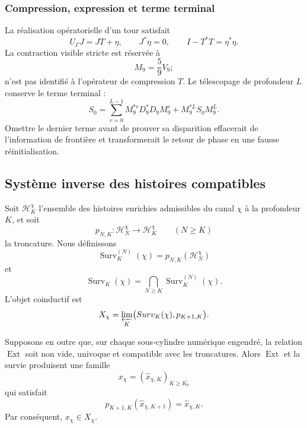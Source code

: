 \subsubsection{Compression, expression et terme terminal}

La réalisation opératorielle d’un tour satisfait
\begin{equation}
 U_\Gamma J=JT+\eta,
 \qquad
 J^*\eta=0,
 \qquad
 I-T^*T=\eta^*\eta.
 \label{p12-83-c9-s4:eq:compresion-expresion-precision}
\end{equation}
La contraction visible stricte est réservée à
\[
 M_9=\frac59V_9;
\]
n’est pas identifié à l’opérateur de compression \(T\). Le télescopage de
profondeur \(L\) conserve le terme terminal :
\begin{equation}
 S_0=
 \sum_{r=0}^{L-1}M_9^{*r}D_9^*D_9M_9^r
 +M_9^{*L}S_0M_9^L.
 \label{p12-83-c9-s4:eq:telescopia-terminal-precision}
\end{equation}
Omettre le dernier terme avant de prouver sa disparition effacerait
de l’information de frontière et transformerait le retour de phase en une fausse
réinitialisation.

\subsection{Système inverse des histoires compatibles}

Soit \(\mathcal H_K^\chi\) l’ensemble des histoires enrichies admissibles
du canal \(\chi\) à la profondeur \(K\), et soit
\[
 p_{N,K}:\mathcal H_N^\chi\longrightarrow\mathcal H_K^\chi
 \qquad(N\geq K)
\]
la troncature. Nous définissons
\[
 \operatorname{Surv}_K^{(N)}(\chi)
 =p_{N,K}(\mathcal H_N^\chi)
\]
et
\begin{equation}
 \operatorname{Surv}_K(\chi)
 =\bigcap_{N\geq K}\operatorname{Surv}_K^{(N)}(\chi).
 \label{p12-83-c9-s4:eq:supervivencia-todas-profundidades}
\end{equation}
L’objet coinductif est
\begin{equation}
 X_\chi=
 \varprojlim_K
 \bigl(\operatorname{Surv}_K(\chi),p_{K+1,K}\bigr).
 \label{p12-83-c9-s4:eq:limite-inverso-caracteres}
\end{equation}

\begin{theorem}
\label{p12-83-c9-s4:thm:seccion-compatible-caracteres}
Supposons en outre que, sur chaque sous-cylindre numérique engendré, la
relation \(\operatorname{Ext}\) soit non vide, univoque et compatible avec les
troncatures. Alors \(\operatorname{Ext}\) et la survie produisent une famille
\[
 x_\chi=(\widehat x_{\chi,K})_{K\geq K_0}
\]
qui satisfait
\[
 p_{K+1,K}(\widehat x_{\chi,K+1})
 =\widehat x_{\chi,K}.
\]
Par conséquent, \(x_\chi\in X_\chi\).
\end{theorem}

